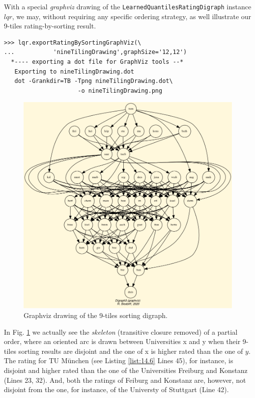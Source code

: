 With a special \emph{graphviz} drawing of the \texttt{LearnedQuantilesRatingDigraph} instance $lqr$, we may, without requiring any specific ordering strategy, as well illustrate our 9-tiles rating-by-sorting result.

\begin{lstlisting}
>>> lqr.exportRatingBySortingGraphViz(\
...           'nineTilingDrawing',graphSize='12,12')
  *---- exporting a dot file for GraphViz tools --*
   Exporting to nineTilingDrawing.dot
   dot -Grankdir=TB -Tpng nineTilingDrawing.dot\
                     -o nineTilingDrawing.png
\end{lstlisting}

\begin{figure}[h]
\includegraphics[width=12cm]{Figures/nineTilingDrawing.png}
\caption{Graphviz drawing of the 9-tiles sorting digraph.}
\label{fig:14.7}       %
\end{figure}

In Fig. \ref{fig:14.7} we actually see the \emph{skeleton} (transitive closure removed) of a partial order, where an oriented arc is drawn between Universities x and y when their 9-tiles sorting results are disjoint and the one of x is higher rated than the one of $y$. The rating for TU München (see Listing \ref{list:14.6} Lines 45), for instance, is disjoint and higher rated than the one of the Universities Freiburg and Konstanz (Lines 23, 32). And, both the ratings of Feiburg and Konstanz are, however, not disjoint from the one, for instance, of the Universty of Stuttgart (Line 42).

